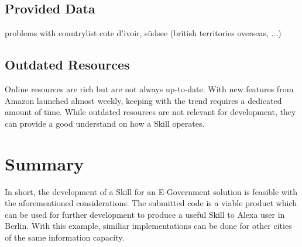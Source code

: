 \subsection*{Provided Data}
problems with countrylist
cote d'ivoir, südsee (british territories overseas, ...)




%
%
%

\subsection*{Outdated Resources}
Online resources are rich but are not always up-to-date. %
With new features from Amazon launched almost weekly, keeping with the trend requires a dedicated amount of time.
While outdated resources are not relevant for development, they can provide a good understand on how a Skill operates. %
%
%
%

%
%
%
%



\section{Summary}

In short, the development of a Skill for an E-Government solution is feasible with the aforementioned considerations. The submitted code is a viable product which can be used for further development to produce a useful Skill to Alexa user in Berlin. With this example, similiar implementations can be done for other cities of the same information capacity.


